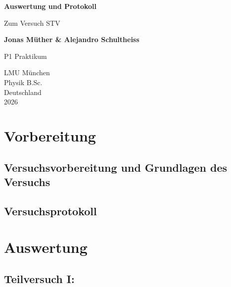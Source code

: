 \documentclass{report}
\begin{document}

\begin{titlepage}
    \begin{center}
        \vspace*{1cm}
            
        \Huge
        \textbf{Auswertung und Protokoll}
            
        \vspace{0.5cm}
        \LARGE
        Zum Versuch STV
        
        \vspace{1.8cm}

        \textbf{Jonas Müther \& Alejandro Schultheiss}
        \vfill
            
        P1 Praktikum\\
       
            
        \vspace{0.8cm}
  

        \vspace{1.8cm}
        \Large
        LMU München \\
        Physik B.Sc.\\
        Deutschland\\
        2026
            
    \end{center}
\end{titlepage}
\tableofcontents

\newpage
\chapter{Vorbereitung}

\section{Versuchsvorbereitung und Grundlagen des Versuchs}


\section{Versuchsprotokoll}


\newpage
\chapter{Auswertung}
\section{Teilversuch I:}
\end{document}
